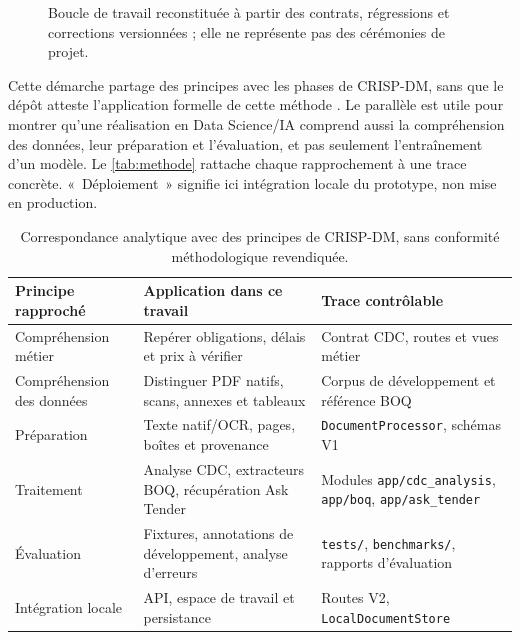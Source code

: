 \begin{figure}[htbp]\centering
{}
\caption{Boucle de travail reconstituée à partir des contrats, régressions et corrections versionnées ; elle ne représente pas des cérémonies de projet.}\label{fig:workflow}
\end{figure}

Cette démarche partage des principes avec les phases de CRISP-DM, sans que le dépôt atteste l'application formelle de cette méthode \cite{crispdm}. Le parallèle est utile pour montrer qu'une réalisation en Data Science/IA comprend aussi la compréhension des données, leur préparation et l'évaluation, et pas seulement l'entraînement d'un modèle. Le \autoref{tab:methode} rattache chaque rapprochement à une trace concrète. «~Déploiement~» signifie ici intégration locale du prototype, non mise en production.

\begin{table}[htbp]\centering\tighttable
\begin{tabularx}{\textwidth}{@{}p{29mm}Y Y@{}}\toprule
Principe rapproché & Application dans ce travail & Trace contrôlable\\\midrule
Compréhension métier & Repérer obligations, délais et prix à vérifier & Contrat CDC, routes et vues métier\\
Compréhension des données & Distinguer PDF natifs, scans, annexes et tableaux & Corpus de développement et référence BOQ\\
Préparation & Texte natif/OCR, pages, boîtes et provenance & \texttt{DocumentProcessor}, schémas V1\\
Traitement & Analyse CDC, extracteurs BOQ, récupération Ask Tender & Modules \texttt{app/cdc\_analysis}, \texttt{app/boq}, \texttt{app/ask\_tender}\\
Évaluation & Fixtures, annotations de développement, analyse d'erreurs & \texttt{tests/}, \texttt{benchmarks/}, rapports d'évaluation\\
Intégration locale & API, espace de travail et persistance & Routes V2, \texttt{LocalDocumentStore}\\\bottomrule
\end{tabularx}
\caption{Correspondance analytique avec des principes de CRISP-DM, sans conformité méthodologique revendiquée.}\label{tab:methode}
\end{table}

